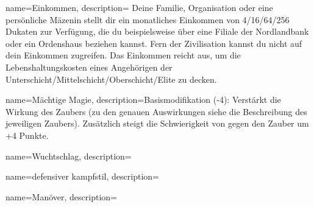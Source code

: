 {
    name={Einkommen},
    description={
Deine Familie, Organisation oder eine persönliche Mäzenin stellt dir ein monatliches Einkommen von 4/16/64/256 Dukaten zur Verfügung, die du beispielsweise über eine Filiale der Nordlandbank oder ein Ordenshaus beziehen kannst. Fern der Zivilisation kannst du nicht auf dein Einkommen zugreifen. Das Einkommen reicht aus, um die Lebenshaltungskosten eines Angehörigen der Unterschicht/Mittelschicht/Oberschicht/Elite zu decken.}}

{
    name={Mächtige Magie},
    description={Basismodifikation (-4): Verstärkt die Wirkung des Zaubers (zu den genauen Auswirkungen siehe die Beschreibung des jeweiligen Zaubers). Zusätzlich steigt die Schwierigkeit von  gegen den Zauber um +4 Punkte.}}
    
    

{
    name={Wuchtschlag},
    description={}}

{
    name={defensiver kampfstil},
    description={}}

{
    name={Manöver},
    description={}}
        
        
    
        
        
        
        
    

